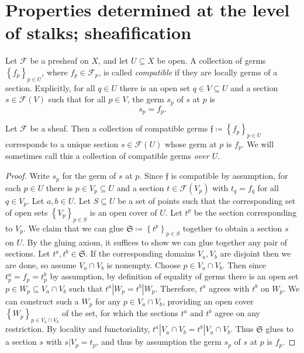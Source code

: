 \section{Properties determined at the level of stalks; sheafification}

\begin{definition}\label{dfn:2-4-1}
	Let $\mathcal{F} $ be a presheaf on $X$, and let $U\subseteq X$ be open. A collection of germs $\left\{ f_p \right\} _{p\in U} $, where $f_p\in \mathcal{F} _p$, is called \emph{compatible} if they are locally germs of a section. Explicitly, for all $q\in U$ there is an open set $q\in V \subseteq U$ and a section $s\in \mathcal{F} (V)$ such that for all $p\in V$, the germ $s_p$ of $s$ at $p$ is
	\[
		s_p=f_p
	.\]
\end{definition}
\begin{proposition}\label{prp:2-4-2}
	Let $\mathcal{F} $ be a sheaf. Then a collection of compatible germs $\mathfrak{f} \coloneqq \left\{ f_p \right\}_{p\in U} $ corresponds to a unique section $s\in \mathcal{F} (U)$ whose germ at $p$ is $f_p$. We will sometimes call this a collection of compatible germs \emph{over $U$}.
\end{proposition}
\begin{proof}
	Write $s_p$ for the germ of $s$ at $p$. Since $\mathfrak{f} $ is compatible by assumption, for each $p\in U$ there is $p\in V_p\subseteq U$ and a section $t\in \mathcal{F} (V_p)$ with $t_q=f_q$ for all $q\in V_p$. Let $a,b\in U$. Let $S\subseteq U$ be a set of points such that the corresponding set of open sets $\left\{ V_p \right\} _{p\in S} $ is an open cover of $U$. Let $t^{p} $ be the section corresponding to $V_p$. We claim that we can glue $\mathfrak{S} \coloneqq \left\{ t^p \right\}_{p\in S} $ together to obtain a section $s$ on $U$. By the gluing axiom, it suffices to show we can glue together any pair of sections. Let $t^a,t^b\in \mathfrak{S} $. If the corresponding domains $V_a,V_b$ are disjoint then we are done, so assume $V_a \cap V_b$ is nonempty. Choose $p\in V_a \cap V_b$. Then since $t^a_p =f_p= t^b_p$ by assumption, by definition of equality of germs there is an open set $p\in W_p \subseteq V_a \cap V_b$ such that $t^a|W_p = t^b|W_p$. Therefore, $t^a$ agrees with $t^b$ on $W_p$. We can construct such a $W_p$ for any $p\in V_a \cap V_b$, providing an open cover $\left\{ W_p \right\} _{p\in V_a \cap V_b} $ of the set, for which the sections $t^a$ and $t^b$ agree on any restriction. By locality and functoriality, $t^a|V_a \cap V_b = t^b|V_a \cap V_b$. Thus $\mathfrak{S} $ glues to a section $s$ with $s|V_p = t_p$, and thus by assumption the germ $s_p$ of $s$ at $p$ is $f_p$.
\end{proof}

